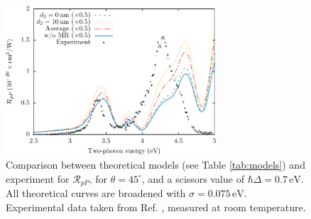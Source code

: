 \begin{figure}
\centering
\includegraphics[width=0.7\textwidth]{figures/fig-4_4_14}
\caption{Comparison between theoretical models (see Table
\ref{tab:models}) and experiment for $\mathcal{R}_{pP}$, for
$\theta=45^{\circ}$, and a scissors value of $\hbar\Delta = 0.7\,\text{eV}$.
All theoretical curves are broadened with $\sigma=0.075\,\text{eV}$.
Experimental data taken from Ref. \cite{mitchellSS01}, measured at room
temperature.}
\label{fig:mr3}
\end{figure}
